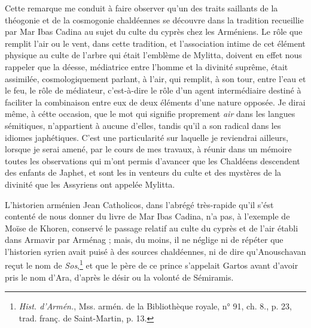 \documentclass[a4paper, 11pt, oneside, polutonikogreek, french]{article}
\begin{document}
Cette remarque me conduit à faire observer qu'un des traits saillants de la théogonie et de la cosmogonie chaldéennes se découvre dans la tradition recueillie par Mar Ibas Cadina au sujet du culte du cyprès chez les Arméniens. Le rôle que remplit l'air ou le vent, dans cette tradition, et l'association intime de cet élément physique au culte de l'arbre qui était l'emblème de Mylitta, doivent en effet nous rappeler que la déesse, médiatrice entre l'homme et la divinité suprême, était assimilée, cosmologiquement parlant, à l'air, qui remplit, à son tour, entre l'eau et le feu, le rôle de médiateur, c'est-à-dire le rôle d'un agent intermédiaire destiné à faciliter la combinaison entre eux de deux éléments d'une nature opposée. Je dirai même, à cétte occasion, que le mot qui signifie proprement \emph{air} dans les langues sémitiques, n'appartient à aucune d'elles, tandis qu'il a son radical dans les idiomes japhétiques. C'est une particularité sur laquelle je reviendrai ailleurs, lorsque je serai amené, par le cours de mes travaux, à réunir dans un mémoire toutes les observations qui m'ont permis d'avancer que les Chaldéens descendent des enfants de Japhet, et sont les in venteurs du culte et des mystères de la divinité que les Assyriens ont appelée Mylitta.

L'historien arménien Jean Catholicos, dans l'abrégé très-rapide qu'il s'ést contenté de nous donner du livre de Mar Ibas Cadina, n'a pas, à l'exemple de Moïse de Khoren, conservé le passage relatif au culte du cyprès et de l'air établi dans Armavir par Arménag ; mais, du moins, il ne néglige ni de répéter que l'historien syrien avait puisé à des sources chaldéennes, ni de dire qu'Anouschavan reçut le nom de \emph{Sos},\footnote{\emph{Hist. d'Armén.}, Mss. armén. de la Bibliothèque royale, n° 91, ch. 8., p. 23, trad. franç. de Saint-Martin, p. 13.} et que le père de ce prince s'appelait Gartos avant d'avoir pris le nom d'Ara, d'après le désir ou la volonté de Sémiramis.
\end{document}
